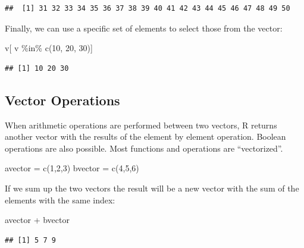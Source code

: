 \documentclass[
]{book}
\newenvironment{Shaded}{\begin{snugshade}}{\end{snugshade}}
\newcommand{\DecValTok}[1]{\textcolor[rgb]{0.00,0.00,0.81}{#1}}
\newcommand{\FunctionTok}[1]{\textcolor[rgb]{0.00,0.00,0.00}{#1}}
\newcommand{\NormalTok}[1]{#1}
\newcommand{\OtherTok}[1]{\textcolor[rgb]{0.56,0.35,0.01}{#1}}
\newcommand{\SpecialCharTok}[1]{\textcolor[rgb]{0.00,0.00,0.00}{#1}}
\theoremstyle{definition}
\theoremstyle{definition}
\theoremstyle{definition}
\theoremstyle{definition}
\theoremstyle{remark}
\begin{document}
\begin{verbatim}
##  [1] 31 32 33 34 35 36 37 38 39 40 41 42 43 44 45 46 47 48 49 50
\end{verbatim}

Finally, we can use a specific set of elements to select those from the vector:

\begin{Shaded}
\begin{Highlighting}[]
\NormalTok{v[ v }\SpecialCharTok{\%in\%} \FunctionTok{c}\NormalTok{(}\DecValTok{10}\NormalTok{, }\DecValTok{20}\NormalTok{, }\DecValTok{30}\NormalTok{)]}
\end{Highlighting}
\end{Shaded}

\begin{verbatim}
## [1] 10 20 30
\end{verbatim}

\hypertarget{vector-operations}{%
\subsection{Vector Operations}\label{vector-operations}}

When arithmetic operations are performed between two vectors, R returns another vector with the results of the element by element operation. Boolean operations are also possible. Most functions and operations are ``vectorized''.

\begin{Shaded}
\begin{Highlighting}[]
\NormalTok{avector }\OtherTok{=} \FunctionTok{c}\NormalTok{(}\DecValTok{1}\NormalTok{,}\DecValTok{2}\NormalTok{,}\DecValTok{3}\NormalTok{)}
\NormalTok{bvector }\OtherTok{=} \FunctionTok{c}\NormalTok{(}\DecValTok{4}\NormalTok{,}\DecValTok{5}\NormalTok{,}\DecValTok{6}\NormalTok{)}
\end{Highlighting}
\end{Shaded}

If we sum up the two vectors the result will be a new vector with the sum of the elements with the same index:

\begin{Shaded}
\begin{Highlighting}[]
\NormalTok{avector }\SpecialCharTok{+}\NormalTok{ bvector}
\end{Highlighting}
\end{Shaded}

\begin{verbatim}
## [1] 5 7 9
\end{verbatim}
\end{document}
